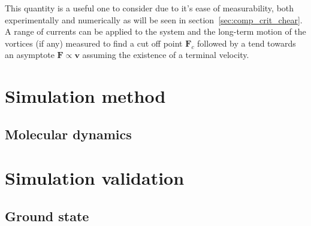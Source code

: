 \documentclass{article}
\numberwithin{equation}{section}
\begin{document}
This quantity is a useful one to consider due to it's ease of measurability, both experimentally and numerically as will be seen in section~\ref{sec:comp_crit_chear}. A range of currents can be applied to the system and the long-term motion of the vortices (if any) measured to find a cut off point $\mathbf{F}_c$ followed by a tend towards an asymptote $\mathbf{F} \propto \mathbf{v}$ assuming the existence of a terminal velocity.

\section{Simulation method}
\subsection{Molecular dynamics}

\section{Simulation validation}
\subsection{Ground state}
\end{document}
